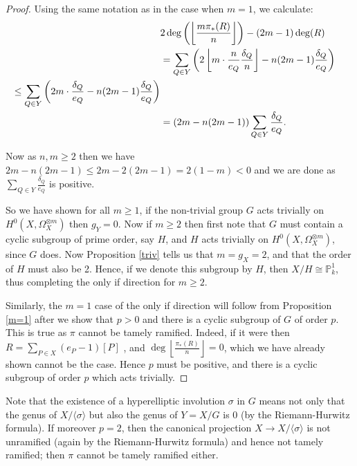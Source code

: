 \begin{proof}
    Using the same notation as in the case when $m=1$, we calculate:
        \begin{align*}
        \lefteqn{2\deg\left(\left\lfloor\frac{m\pi_*(R)}{n}\right\rfloor\right)-(2m-1)\deg(R)}\\
        & = \sum_{Q \in Y} \left(2\left\lfloor m\cdot \frac{n}{e_Q}\frac{\delta_Q}{n}\right\rfloor -n(2m-1)\frac{\delta_Q}{e_Q}\right) \\
        \leq   \sum_{Q\in Y}\left( 2m\cdot\frac{\delta_Q}{e_Q}-n(2m-1)\frac{\delta_Q}{e_Q}\right) \\
        & =  (2m-n(2m-1))\sum_{Q\in Y }\frac{\delta_Q}{e_Q}.
        \end{align*}
    
    Now as $n,m\geq 2$ then we have $2m-n(2m-1)\leq 2m-2(2m-1)=2(1-m)<0$ and we are done as $\sum_{Q\in Y}\frac{\delta_Q}{e_Q}$ is positive.
    
    So we have shown for all $m\geq 1$, if the non-trivial group $G$ acts trivially  on $H^0(X,\Omega_X^{\otimes m})$ then $g_Y=0$.
    Now if $m\geq 2$ then first note that $G$ must contain a cyclic subgroup of prime order, say $H$, and $H$ acts trivially on $H^0(X,\Omega_X^{\otimes m})$, since $G$ does.
    Now Proposition \ref{triv} tells us that $m=g_X=2$, and that the order of $H$ must also be 2.
    Hence, if we denote this subgroup by $H$, then $X/H\cong \mathbb{P}_k^1$, thus completing the only if direction for $m\geq 2$.
    
    Similarly, the $m=1$ case of the only if direction will follow from Proposition \ref{m=1} after we show that $p>0$ and there is a cyclic subgroup of $G$ of order $p$. 
    This is true as $\pi$ cannot be tamely ramified.
    Indeed, if it were then $R=\sum_{P\in X} (e_P-1)[P]$ \cite[Chap. IV, Cor. 2.4]{hart}, and $\deg\left\lfloor \frac{\pi_*(R)}{n} \right\rfloor=0$, which we have already shown cannot be the case.
    Hence $p$ must be positive, and there is a cyclic subgroup of order $p$ which acts trivially.
    \end{proof}

    \begin{rem}
    Note that the existence of a hyperelliptic involution $\sigma$ in $G$ means not only that the genus of $X/\langle \sigma \rangle$ but also the genus of $Y=X/G$ is $0$ (by the Riemann-Hurwitz formula).
    If moreover $p=2$, then the canonical projection $X\rightarrow X/\langle \sigma \rangle$ is not unramified (again by the Riemann-Hurwitz formula) and hence not tamely ramified; then $\pi$ cannot be tamely ramified either.
    \end{rem}


